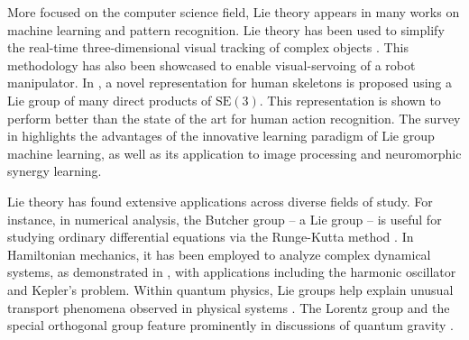 More focused on the computer science field, Lie theory appears in many works on machine learning and pattern recognition. Lie theory has been used to simplify the real-time three-dimensional visual tracking of complex objects \citep{Drummond2002}. This methodology has also been showcased to enable visual-servoing of a robot manipulator. In \citet{Vemulapalli2014}, a novel representation for human skeletons is proposed using a Lie group of many direct products of $\text{SE}(3)$. This representation is shown to perform better than the state of the art for human action recognition. The survey in \citet{Lu2020} highlights the advantages of the innovative learning paradigm of Lie group machine learning, as well as its application to image processing and neuromorphic synergy learning.

Lie theory has found extensive applications across diverse fields of study. For instance, in numerical analysis, the Butcher group -- a Lie group -- is useful for studying ordinary differential equations via the Runge-Kutta method \citep{Bogfjellmo2017}. In Hamiltonian mechanics, it has been employed to analyze complex dynamical systems, as demonstrated in \citet{Hamburger2009}, with applications including the harmonic oscillator and Kepler's problem. Within quantum physics, Lie groups help explain unusual transport phenomena observed in physical systems \citep{Ilievski2021}. The Lorentz group and the special orthogonal group feature prominently in discussions of quantum gravity \citep{Dreyer2003,Kapec2017}.
